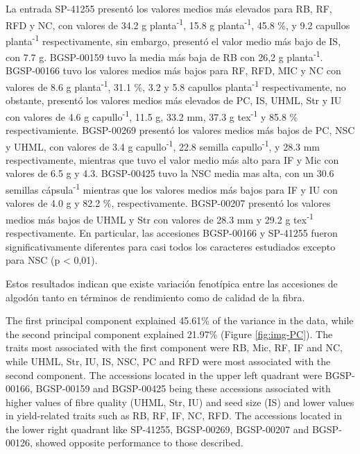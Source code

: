 \documentclass[12pt,oneside]{reedthesis}
\begin{document}
La entrada SP-41255 presentó los valores medios más elevados para RB, RF, RFD y NC, con valores de 34.2 g planta\textsuperscript{-1}, 15.8 g planta\textsuperscript{-1}, 45.8 \%, y 9.2 capullos planta\textsuperscript{-1} respectivamente, sin embargo, presentó el valor medio más bajo de IS, con 7.7 g. BGSP-00159 tuvo la media más baja de RB con 26,2 g planta\textsuperscript{-1}. BGSP-00166 tuvo los valores medios más bajos para RF, RFD, MIC y NC con valores de 8.6 g planta\textsuperscript{-1}, 31.1 \%, 3.2 y 5.8 capullos planta\textsuperscript{-1} respectivamente, no obstante, presentó los valores medios más elevados de PC, IS, UHML, Str y IU con valores de 4.6 g capullo\textsuperscript{-1}, 11.5 g, 33.2 mm, 37.3 g tex\textsuperscript{-1} y 85.8 \% respectivamiente. BGSP-00269 presentó los valores medios más bajos de PC, NSC y UHML, con valores de 3.4 g capullo\textsuperscript{-1}, 22.8 semilla capullo\textsuperscript{-1}, y 28.3 mm respectivamente, mientras que tuvo el valor medio más alto para IF y Mic con valores de 6.5 g y 4.3. BGSP-00425 tuvo la NSC media mas alta, con un 30.6 semillas cápsula\textsuperscript{-1} mientras que los valores medios más bajos para IF y IU con valores de 4.0 g y 82.2 \%, respectivamente. BGSP-00207 presentó los valores medios más bajos de UHML y Str con valores de 28.3 mm y 29.2 g tex\textsuperscript{-1} respectivamente. En particular, las accesiones BGSP-00166 y SP-41255 fueron significativamente diferentes para casi todos los caracteres estudiados excepto para NSC (p \textless{} 0,01).

Estos resultados indican que existe variación fenotípica entre las accesiones de algodón tanto en términos de rendimiento como de calidad de la fibra.

The first principal component explained 45.61\% of the variance in the data, while the second principal component explained 21.97\% (Figure \ref{fig:img-PC}). The traits most associated with the first component were RB, Mic, RF, IF and NC, while UHML, Str, IU, IS, NSC, PC and RFD were most associated with the second component. The accessions located in the upper left quadrant were BGSP-00166, BGSP-00159 and BGSP-00425 being these accessions associated with higher values of fibre quality (UHML, Str, IU) and seed size (IS) and lower values in yield-related traits such as RB, RF, IF, NC, RFD. The accessions located in the lower right quadrant like SP-41255, BGSP-00269, BGSP-00207 and BGSP-00126, showed opposite performance to those described.
\end{document}

